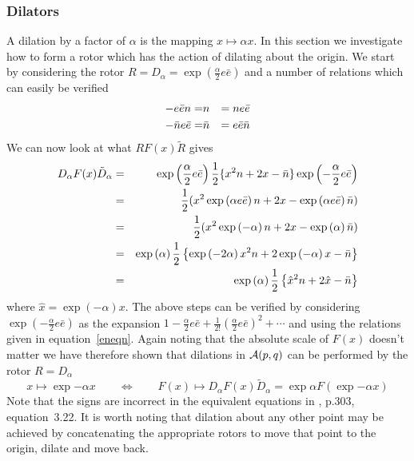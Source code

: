 \subsubsection{Dilators}


A dilation by a factor of $\alpha$ is the mapping
$x \mapsto \alpha x$. In this section we investigate how
to form a rotor which has the action of dilating about the
origin. We start by considering the rotor $R = D_{\alpha} =
\exp\left({\frac{\alpha}{2}e\bar{e}}\right)$ and a number of
relations which can easily be verified
%
\begin{eqnarray}
   -e\bar{e}n  = &  {n} & = ne\bar{e}  \nonumber \\
   -\bar{n}e\bar{e} = &  \bar{n} & =  e\bar{e}\bar{n}  \label{eneqn}
\end{eqnarray}
%
We can now look at what $RF(x)\tilde{R}$ gives
%
\begin{eqnarray}
D_\alpha F(x) \tilde{D}_\alpha & = & \exp\left({\frac{\alpha}{2}e\bar{e}}\right)\frac{1}{2}\{ x^2n + 2x - \bar{n}\}\exp\left({-\frac{\alpha}{2}e\bar{e}}\right) \nonumber \\
   &  =  &  \frac{1}{2}(x^2  \exp\left({\alpha e\bar{e}}\right)n + 2x - \exp\left({\alpha e\bar{e}}\right)\bar{n}) \nonumber \\
   & = &  \frac{1}{2}(x^2 \exp\left({-\alpha}\right) n + 2x - \exp\left({\alpha}\right)\bar{n}) \nonumber \\
   & = & \exp\left({\alpha}\right)\frac{1}{2}\left\{\exp\left({-2\alpha}\right)x^2n + 2\exp\left({-\alpha}\right)x - \bar{n}\right\} \nonumber \\
   & = & \exp\left({\alpha}\right)\frac{1}{2}\left\{\hat{x}^2n + 2\hat{x} -\bar{n}\right\}
\label{Deqn}
\end{eqnarray}
%
where $\hat{x} = \exp\left({-\alpha}\right)x$. The above steps can be
verified by considering $\exp\left({-\frac{\alpha}{2}e\bar{e}}\right)$ as
the expansion $1 - \frac{\alpha}{2}e\bar{e} +
\frac{1}{2!}\left(\frac{\alpha}{2}e\bar{e}\right)^2 +
\cdots$ and using the relations given in
equation~\ref{eneqn}.
Again noting that the absolute scale of $F(x)$ doesn't matter we
have therefore shown that dilations  in ${\mathcal{A}}(p,q)$ can be performed by
the rotor    $R=D_\alpha$
 \begin{equation}
x \mapsto \exp{-\alpha}x \qquad \Leftrightarrow \qquad F(x)
\mapsto  D_{\alpha} F(x) \tilde{D}_{\alpha} =
\exp{\alpha}F(\exp{-\alpha}x)
\end{equation}
%
Note that the signs are incorrect in the equivalent
equations in \cite{HS84}, p.303, equation~3.22. It is worth noting
that dilation about any other point may be achieved by concatenating the
appropriate rotors to move that point to the origin, dilate and move back.


